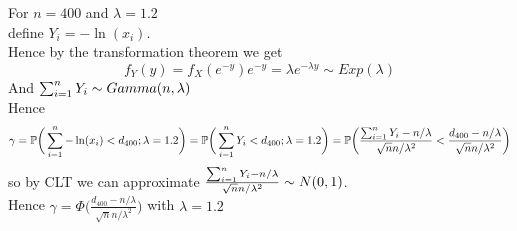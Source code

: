 \begin{enumerate}
	
	For $n=400$ and $\lambda=1.2$\\
	define $Y_i=-\ln (x_i)$.\\
	Hence by the transformation theorem we get
	$$f_Y(y)=f_X(e^{-y})e^{-y}=\lambda e^{-\lambda y} \sim Exp (\lambda)$$
	And $\sum_{i=1}^n Y_i \sim Gamma(n,\lambda)$\\
	Hence
	$$\gamma = \mathbb{P} \bigg(\sum_{i=1}^n -\ln (x_i) < d_{400}; \lambda=1.2\bigg)=\mathbb{P}\bigg(\sum_{i=1}^n Y_i < d_{400}; \lambda=1.2\bigg) = \mathbb{P}\bigg(  \frac{\sum_{i=1}^n Y_i - n/\lambda}{\sqrt{n}n/\lambda^2} <  \frac{d_{400} - n/\lambda}{\sqrt{n}n/\lambda^2} \bigg)$$
	so by CLT we can approximate $ \frac{\sum_{i=1}^n Y_i - n/\lambda}{\sqrt{n}n/\lambda^2} \sim N(0,1)$.
	\\Hence  $\gamma = \Phi\bigg( \frac{d_{400} - n/\lambda}{\sqrt{n}n/\lambda^2} \bigg)$ with $\lambda = 1.2$
\end{enumerate}

